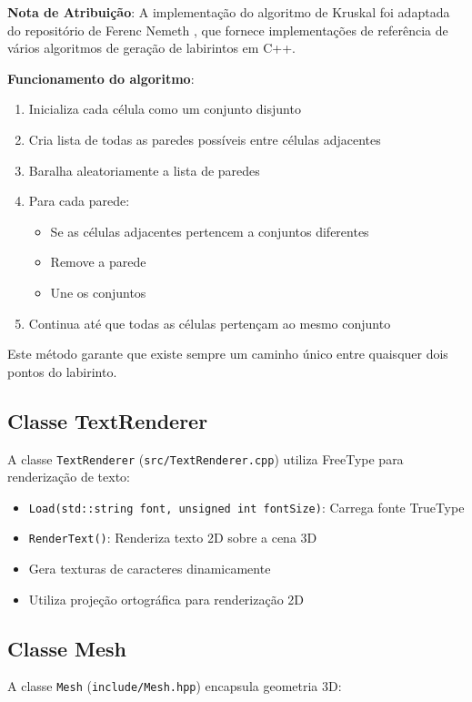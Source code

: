 \textbf{Nota de Atribuição}: A implementação do algoritmo de Kruskal foi adaptada do repositório de Ferenc Nemeth \cite{MazeAlgorithms}, que fornece implementações de referência de vários algoritmos de geração de labirintos em C++.

\textbf{Funcionamento do algoritmo}:
\begin{enumerate}
    \item Inicializa cada célula como um conjunto disjunto
    \item Cria lista de todas as paredes possíveis entre células adjacentes
    \item Baralha aleatoriamente a lista de paredes
    \item Para cada parede:
    \begin{itemize}
        \item Se as células adjacentes pertencem a conjuntos diferentes
        \item Remove a parede
        \item Une os conjuntos
    \end{itemize}
    \item Continua até que todas as células pertençam ao mesmo conjunto
\end{enumerate}

Este método garante que existe sempre um caminho único entre quaisquer dois pontos do labirinto.

\subsection{Classe TextRenderer}
A classe \texttt{TextRenderer} (\texttt{src/TextRenderer.cpp}) utiliza FreeType para renderização de texto:

\begin{itemize}
    \item \texttt{Load(std::string font, unsigned int fontSize)}: Carrega fonte TrueType
    \item \texttt{RenderText()}: Renderiza texto 2D sobre a cena 3D
    \item Gera texturas de caracteres dinamicamente
    \item Utiliza projeção ortográfica para renderização 2D
\end{itemize}

\subsection{Classe Mesh}
A classe \texttt{Mesh} (\texttt{include/Mesh.hpp}) encapsula geometria 3D:

